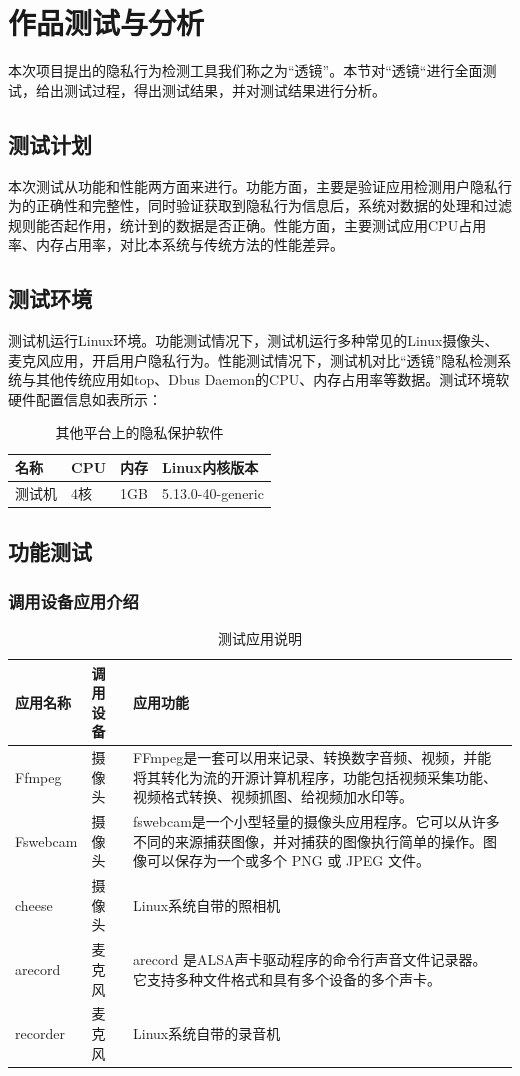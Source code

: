 \documentclass[12pt,a4paper]{ctexart}
\begin{document}
\section{作品测试与分析}
本次项目提出的隐私行为检测工具我们称之为“透镜”。本节对“透镜“进行全面测试，给出测试过程，得出测试结果，并对测试结果进行分析。
\subsection{测试计划}
本次测试从功能和性能两方面来进行。功能方面，主要是验证应用检测用户隐私行为的正确性和完整性，同时验证获取到隐私行为信息后，系统对数据的处理和过滤规则能否起作用，统计到的数据是否正确。性能方面，主要测试应用CPU占用率、内存占用率，对比本系统与传统方法的性能差异。
\subsection{测试环境}
测试机运行Linux环境。功能测试情况下，测试机运行多种常见的Linux摄像头、麦克风应用，开启用户隐私行为。性能测试情况下，测试机对比“透镜”隐私检测系统与其他传统应用如top、Dbus Daemon的CPU、内存占用率等数据。测试环境软硬件配置信息如表所示：

\begin{table}
\begin{tabular}{|l|l|l|l|}
  \hline
  \rowcolor{blue!50} 名称&CPU&内存&Linux内核版本\\
  \hline
  测试机&4核&1GB&5.13.0-40-generic\\
  \hline
\end{tabular}
\caption{其他平台上的隐私保护软件}
\end{table}

\subsection{功能测试}
\subsubsection{调用设备应用介绍}
\begin{table}
\begin{tabular}{|p{3cm}|p{3cm}|p{6cm}|}
  \hline
  \rowcolor{blue!50}应用名称&调用设备&应用功能\\
  \hline
Ffmpeg&摄像头&FFmpeg是一套可以用来记录、转换数字音频、视频，并能将其转化为流的开源计算机程序，功能包括视频采集功能、视频格式转换、视频抓图、给视频加水印等。\\
\hline
Fswebcam&摄像头&fswebcam是一个小型轻量的摄像头应用程序。它可以从许多不同的来源捕获图像，并对捕获的图像执行简单的操作。图像可以保存为一个或多个 PNG 或 JPEG 文件。\\
\hline
cheese&摄像头&Linux系统自带的照相机\\
\hline
arecord&麦克风&arecord 是ALSA声卡驱动程序的命令行声音文件记录器。 它支持多种文件格式和具有多个设备的多个声卡。\\
\hline
recorder&麦克风&Linux系统自带的录音机\\
\hline
\end{tabular}
\caption{测试应用说明}
\end{table}
\end{document}
